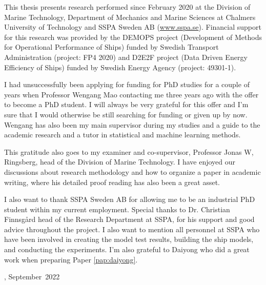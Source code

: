 This thesis presents research performed since February 2020 at the Division of Marine Technology, Department of Mechanics and Marine Sciences at Chalmers University of Technology and SSPA Sweden AB (\href{www.sspa.se}{www.sspa.se}). Financial support for this research was provided by the DEMOPS project (Development of Methods for Operational Performance of Ships) funded by Swedish Transport Administration (project: FP4 2020) and D2E2F project (Data Driven Energy Efficiency of Ships) funded by Swedish Energy Agency (project: 49301-1).

I had unsuccessfully been applying for funding for PhD studies for a couple of years when Professor Wengang Mao contacting me three years ago with the offer to become a PhD student. I will always be very grateful for this offer and I'm sure that I would otherwise be still searching for funding or given up by now. Wengang has also been my main supervisor during my studies and a guide to the academic research and a tutor in statistical and machine learning methods.  

This gratitude also goes to my examiner and co-supervisor, Professor Jonas W, Ringsberg,
head of the Division of Marine Technology. I have enjoyed our discussions about research methodology and how to organize a paper in academic writing, where his detailed proof reading has also been a great asset.

I also want to thank SSPA Sweden AB for allowing me to be an industrial PhD student within my current employment. Special thanks to Dr. Christian Finnsgård head of the Research Department at SSPA, for his support and good advice throughout the project. I also want to mention all personnel at SSPA who have been involved in creating the model test results, building the ship models, and conducting the experiments.
I'm also grateful to Daiyong who did a great work when preparing Paper \ref{pap:daiyong}.

\vskip 2pc

\noindent \thesisauthor

\noindent \thesiscity, September\  2022  %
